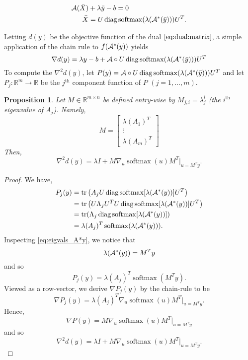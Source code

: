 \documentclass[10pt,a4paper]{article}
\numberwithin{equation}{section}
\newtheorem{proposition}[theorem]{Proposition}
\theoremstyle{definition}
\def\rr{{\mathbb R}}
\def\cA{{\cal A}}
\DeclareMathOperator{\diag}{diag}
\DeclareMathOperator{\softmax}{softmax}
\DeclareMathOperator{\tr}{tr}
\begin{document}
\begin{align}
    \cA (\Bar{X}) &+ \lambda \Bar{y} - b = 0 \label{eq:op1_matrix}\\
    \Bar{X} &= U \diag \softmax(\lambda(\cA^\ast(\Bar{y}))) U^T. \label{eq:op2_matrix}
\end{align}

Letting $d(y)$ be the objective function of the dual $\eqref{eq:dual:matrix}$, a simple application of the chain rule to $f(\cA^\ast(y))$ yields
\[
\nabla d(y) = \lambda y - b + \cA \circ U \diag \softmax(\lambda(\cA^\ast(\Bar{y}))) U^T 
\]
To compute the $\nabla^2 d(y)$, let $P(y) = \cA \circ U \diag \softmax(\lambda(\cA^\ast(\Bar{y}))) U^T$ and let $P_j : \rr^m \to \rr$ be the $j^{\text{th}}$ component function of $P$ $(j=1, \dots, m)$.

\begin{proposition}
    Let $M \in \rr^{m \times n}$ be defined entry-wise by $M_{j,i} = \lambda_j^i$ (the $i^\text{th}$ eigenvalue of $A_j$). Namely,
    \[
    M = \begin{bmatrix}
        \lambda(A_1)^T \\
        \vdots \\
        \lambda(A_m)^T
    \end{bmatrix}
    \]
    Then, 
    \[
    \nabla^2 d(y) = \lambda I + M \nabla_u \softmax(u) M^T |_{u = M^Ty}.
    \]
\end{proposition}

\begin{proof}
We have,
\begin{align*}
P_j(y) &= \tr \left(A_j  U \diag \softmax[\lambda(\cA^\ast(y))] U^T \right) \\
 &= \tr \left(U \Lambda_j U^T  U \diag \softmax[\lambda(\cA^\ast(y))] U^T \right) \\
&= \tr(\Lambda_j  \diag \softmax[\lambda(\cA^\ast(y))]) \\
&= \lambda(A_j)^T \softmax(\lambda(\cA^\ast(y))).
\end{align*}
Inspecting \eqref{eq:eigvals_A*y}, we notice that 
\[
\lambda(\cA^\ast(y)) = M^Ty
\]
and so
\[
P_j(y) =  \lambda(A_j)^T \softmax(M^Ty).
\]
Viewed as a row-vector, we derive $\nabla P_j(y)$ by the chain-rule to be 
\[
\nabla P_j(y) =   \lambda(A_j)^T \nabla_u \softmax(u) M^T |_{u = M^Ty}.
\]
Hence, 
\[
\nabla P(y) = M \nabla_u \softmax(u) M^T |_{u = M^Ty}
\]
and so 
 \[
    \nabla^2 d(y) = \lambda I + M \nabla_u \softmax(u) M^T |_{u = M^Ty}.
    \]
\end{proof}
\end{document}
